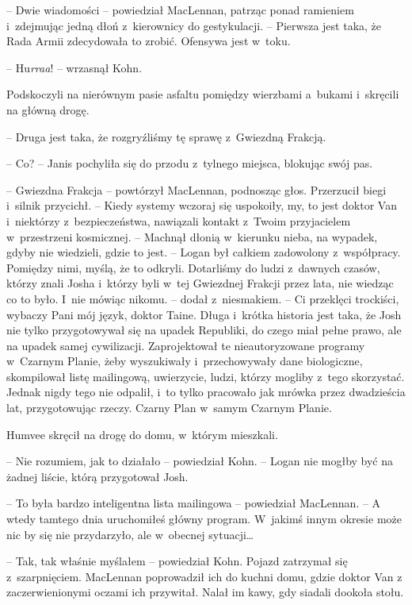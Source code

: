 \documentclass[oneside,polish,11pt,sfheadings]{mwbk}
\begin{document}
-- Dwie wiadomości -- powiedział MacLennan, patrząc ponad ramieniem i~zdejmując jedną dłoń z~kierownicy do gestykulacji. -- Pierwsza jest taka,
że Rada Armii zdecydowała to zrobić. Ofensywa jest w~toku.

-- Hu\emph{rraa}! -- wrzasnął Kohn.

Podskoczyli na nierównym pasie asfaltu pomiędzy wierzbami a~bukami i~skręcili na główną drogę. 

-- Druga jest taka, że rozgryźliśmy tę sprawę z~Gwiezdną Frakcją.

-- Co? -- Janis pochyliła się do przodu z~tylnego miejsca, blokując swój
pas.

-- Gwiezdna Frakcja -- powtórzył MacLennan, podnosząc głos. Przerzucił
biegi i~silnik przycichł. -- Kiedy systemy wczoraj się uspokoiły, my, to
jest doktor Van i~niektórzy z~bezpieczeństwa, nawiązali kontakt z~Twoim
przyjacielem w~przestrzeni kosmicznej. -- Machnął dłonią w~kierunku
nieba, na wypadek, gdyby nie wiedzieli, gdzie to jest. -- Logan był
całkiem zadowolony z~współpracy. Pomiędzy nimi, myślą, że to odkryli.
Dotarliśmy do ludzi z~dawnych czasów, którzy znali Josha i~którzy byli w~tej Gwiezdnej Frakcji przez lata, nie wiedząc co to było. I~nie mówiąc
nikomu. -- dodał z~niesmakiem. -- Ci przeklęci trockiści, wybaczy Pani mój
język, doktor Taine. Długa i~krótka historia jest taka, że Josh nie
tylko przygotowywał się na upadek Republiki, do czego miał pełne prawo,
ale na upadek samej cywilizacji. Zaprojektował te nieautoryzowane
programy w~Czarnym Planie, żeby wyszukiwały i~przechowywały dane
biologiczne, skompilował listę mailingową, uwierzycie, ludzi, którzy
mogliby z~tego skorzystać. Jednak nigdy tego nie odpalił, i~to tylko
pracowało jak mrówka przez dwadzieścia lat, przygotowując rzeczy. Czarny
Plan w~samym Czarnym Planie.

Humvee skręcił na drogę do domu, w~którym mieszkali. 

-- Nie rozumiem, jak
to działało -- powiedział Kohn. -- Logan nie mogłby być na żadnej liście,
którą przygotował Josh.

-- To była bardzo inteligentna lista mailingowa -- powiedział MacLennan. -- A wtedy tamtego dnia uruchomiłeś główny program. W~jakimś innym okresie
może nic by się nie przydarzyło, ale w~obecnej sytuacji\ldots

-- Tak, tak właśnie myślałem -- powiedział Kohn. Pojazd zatrzymał się z~szarpnięciem. MacLennan poprowadził ich do kuchni domu, gdzie doktor Van
z zaczerwienionymi oczami ich przywitał. Nalał im kawy, gdy siadali
dookoła stołu.
\end{document}
